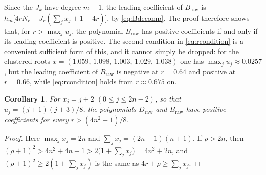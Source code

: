 \documentclass[11pt]{article}
\theoremstyle{plain}
\newtheorem{corollary}[theorem]{Corollary}
\theoremstyle{definition}
\theoremstyle{remark}
\numberwithin{equation}{section}
\newcommand{\raw}{\mathrm{raw}}
\begin{document}
Since the \(J_k\) have degree \(m-1\), the leading coefficient of \(B_{\raw}\) is
\(h_m\bigl[4rN_r-J_r(\sum_jx_j+1-4r)\bigr]\), by \eqref{eq:Bdecomp}. The proof therefore shows
that, for \(r>\max_ju_j\), the polynomial \(B_{\raw}\) has positive coefficients if and only
if its leading coefficient is positive. The second condition in \eqref{eq:rcondition} is a
convenient sufficient form of this, and it cannot simply be dropped: for the clustered roots
\(x=(1.059,\,1.098,\,1.003,\,1.029,\,1.038)\) one has \(\max_ju_j\approx0.0257\), but the
leading coefficient of \(B_{\raw}\) is negative at \(r=0.64\) and positive at \(r=0.66\), while
\eqref{eq:rcondition} holds from \(r\approx0.675\) on.

\begin{corollary}\label{cor:arith}
For \(x_j=j+2\) \((0\le j\le 2n-2)\), so that \(u_j=(j+1)(j+3)/8\), the polynomials
\(D_{\raw}\) and \(B_{\raw}\) have positive coefficients for every \(r>(4n^2-1)/8\).
\end{corollary}
\begin{proof}
Here \(\max_jx_j=2n\) and \(\sum_jx_j=(2n-1)(n+1)\). If \(\rho>2n\), then
\((\rho+1)^2>4n^2+4n+1>2\bigl(1+\sum_jx_j\bigr)=4n^2+2n\), and
\((\rho+1)^2\ge2(1+\sum_jx_j)\) is the same as \(4r+\rho\ge\sum_jx_j\).
\end{proof}
\end{document}
